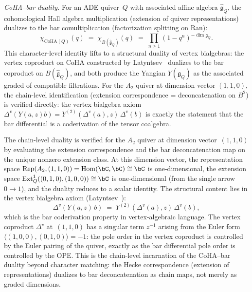 \begin{remark}
\emph{CoHA--bar duality.}
For an ADE quiver~$Q$ with associated affine algebra
$\widehat{\mathfrak{g}}_Q$, the cohomological Hall
algebra multiplication (extension of quiver
representations) dualizes to the bar comultiplication
(factorization splitting on Ran):
\begin{equation}\label{eq:coha-bar-character-duality}
 \chi_{\mathrm{CoHA}(Q)}(q)
 \;=\;
 \chi_{B(\widehat{\mathfrak{g}}_Q)}(q)
 \;=\;
 \prod_{n \geq 1}(1 - q^n)^{-\dim \mathfrak{g}_Q}.
\end{equation}
This character-level identity lifts to a structural duality
of vertex bialgebras: the vertex coproduct on CoHA
constructed by Latyntsev~\cite{Latyntsev23} dualizes to the
bar coproduct on $B(\widehat{\mathfrak{g}}_Q)$, and both
produce the Yangian $Y(\mathfrak{g}_Q)$ as the associated
graded of compatible filtrations. For the $A_2$ quiver at
dimension vector $(1,1,0)$, the chain-level identification
(extension correspondence = deconcatenation on $B^2$)
is verified directly: the vertex bialgebra axiom
$\Delta^v(Y(a,z)b) = Y^{(2)}(\Delta^v(a),z)\,\Delta^v(b)$
is exactly the statement that the bar differential is a
coderivation of the tensor coalgebra.

The chain-level duality is verified for the $A_2$ quiver at
dimension vector~$(1,1,0)$
by evaluating the extension correspondence and the bar
deconcatenation map on the unique nonzero extension class.
At this dimension vector, the representation space
$\operatorname{Rep}(A_2, (1,1,0)) = \operatorname{Hom}(\bC, \bC)
\cong \bC$ is one-dimensional, the extension space
$\operatorname{Ext}^1_Q((0,1,0),(1,0,0)) \cong \bC$ is
one-dimensional (from the single arrow $0 \to 1$), and the
duality reduces to a scalar identity. The structural content
lies in the vertex bialgebra axiom
(Latyntsev~\cite{Latyntsev23}):
\begin{equation}\label{eq:jkl-vertex-bialgebra}
 \Delta^v(Y(a,z)\,b)
 \;=\;
 Y^{(2)}(\Delta^v(a),z)\,\Delta^v(b),
\end{equation}
which is the bar coderivation property in vertex-algebraic
language. The vertex coproduct $\Delta^v$ at~$(1,1,0)$ has a
singular term $z^{-1}$ arising from the Euler form
$\langle (1,0,0), (0,1,0) \rangle = -1$: the pole order in
the vertex coproduct is controlled by the
Euler pairing of the quiver, exactly as the bar differential
pole order is controlled by the OPE. This is the
chain-level incarnation of the CoHA--bar duality beyond
character matching: the Hecke correspondence
(extension of representations) dualizes to bar deconcatenation
as chain maps, not merely as graded dimensions.


\end{remark}
